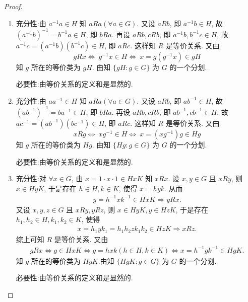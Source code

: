 \documentclass[../../main.tex]{subfiles}%
\begin{document}
\begin{proof}
\begin{enumerate}[(1)]
\item {\heiti 充分性:}由 \( a^{-1}a \in H \) 知 \( aRa(\forall a \in G) \). 又设 \( aRb \), 即 \( a^{-1}b \in H \), 故 \( (a^{-1}b)^{-1} = b^{-1}a \in H \), 即 \( bRa \). 再设 \( aRb, cRb \), 即 \( a^{-1}b, b^{-1}c \in H \), 故 \( a^{-1}c = (a^{-1}b)(b^{-1}c) \in H \), 即 \( aRc \). 这样知 \( R \) 是等价关系. 又由
\[
gRx \iff \ g^{-1}x \in H \iff \ x=g(g^{-1}x) \in gH
\]
知 \( g \) 所在的等价类为 \( gH \). 由知 \( \{gH:g\in G\} \) 为 \( G \) 的一个分划.

{\heiti 必要性:}由等价关系的定义和是显然的.

\item {\heiti 充分性:}由 \( aa^{-1} \in H \) 知 \( aRa(\forall a \in G) \). 又设 \( aRb \), 即 \( ab^{-1} \in H \), 故 \( (ab^{-1})^{-1} = ba^{-1} \in H \), 即 \( bRa \). 再设 \( aRb, cRb \), 即 \( ab^{-1}, cb^{-1} \in H \), 故 \( ac^{-1} = (ab^{-1})(bc^{-1}) \in H \), 即 \( aRc \). 这样知 \( R \) 是等价关系. 又由
\[
xRg \iff \ xg^{-1} \in H \iff \ x=(xg^{-1})g \in Hg
\]
知 \( g \) 所在的等价类为 \( Hg \). 由知 \( \{Hg:g\in G\} \) 为 \( G \) 的一个分划.

{\heiti 必要性:}由等价关系的定义和是显然的.

\item {\heiti 充分性:}对 $\forall x\in G$, 由 $x=1\cdot x\cdot 1\in HxK$ 知 $xRx$.
设 $x,y\in G$ 且 $xRy$, 则 $x\in HyK$, 于是存在 $h\in H,k\in K$, 使得 $x=hyk$. 从而
\begin{align*}
y=h^{-1}xk^{-1}\in HxK\Longrightarrow yRx.
\end{align*}
又设 $x,y,z\in G$ 且 $xRy,yRz$, 则 $x\in HyK,y\in HzK$, 于是存在 $h_1,h_2\in H,k_1,k_2\in K$, 使得
\begin{align*}
x=h_1yk_1=h_1h_2zk_1k_2\in HzK\Longrightarrow xRz.
\end{align*}
综上可知 $R$ 是等价关系. 又由
\begin{align*}
gRx\Longleftrightarrow g\in HxK\Longleftrightarrow g=hxk\left( h\in H,k\in K \right) \Longleftrightarrow x=h^{-1}gk^{-1}\in HgK.
\end{align*}
知 $g$ 所在的等价类为 $HgK$.由知 \( \{HgK:g\in G\} \) 为 \( G \) 的一个分划.

{\heiti 必要性:}由等价关系的定义和是显然的.
\end{enumerate}
\end{proof}
\end{document}
